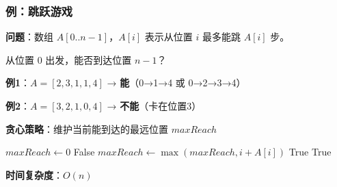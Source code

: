 \documentclass[12pt, a4paper]{ctexart}
\begin{document}
\subsubsection{例：跳跃游戏}

\begin{blackboard}

\textbf{问题}：数组 $A[0..n-1]$，$A[i]$ 表示从位置 $i$ 最多能跳 $A[i]$ 步。

从位置 0 出发，能否到达位置 $n-1$？

\textbf{例1}：$A = [2, 3, 1, 1, 4]$ → \textbf{能}（0→1→4 或 0→2→3→4）

\textbf{例2}：$A = [3, 2, 1, 0, 4]$ → \textbf{不能}（卡在位置3）

\textbf{贪心策略}：维护当前能到达的最远位置 $maxReach$

\end{blackboard}

\begin{blackboard}[跳跃游戏贪心算法]

\begin{algorithmic}[1]
\STATE $maxReach \gets 0$
        \RETURN False 
    \ENDIF
    \STATE $maxReach \gets \max(maxReach, i + A[i])$
        \RETURN True
    \ENDIF
\ENDFOR
\RETURN True
\end{algorithmic}

\textbf{时间复杂度}：$O(n)$

\end{blackboard}
\end{document}
